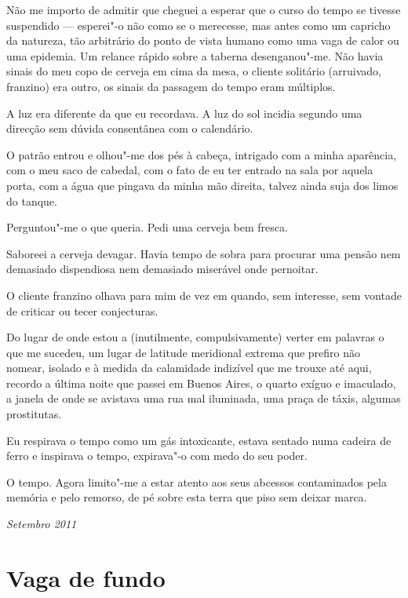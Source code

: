 Não me importo de admitir que cheguei a esperar que o
curso do tempo se tivesse suspendido --- esperei"-o não como se o
merecesse, mas antes como um capricho da natureza, tão arbitrário do
ponto de vista humano como uma vaga de calor ou uma epidemia. Um relance
rápido sobre a taberna desenganou"-me. Não havia sinais do meu copo de
cerveja em cima da mesa, o cliente solitário (arruivado, franzino) era
outro, os sinais da passagem do tempo eram múltiplos.

A luz era diferente da que eu recordava. A luz do sol incidia segundo
uma direcção sem dúvida consentânea com o calendário.

O patrão entrou e olhou"-me dos pés à cabeça, intrigado com a minha
aparência, com o meu saco de cabedal, com o fato de eu ter entrado na
sala por aquela porta, com a água que pingava da minha mão direita,
talvez ainda suja dos limos do tanque.

Perguntou"-me o que queria. Pedi uma cerveja bem fresca.

Saboreei a
cerveja devagar. Havia tempo de sobra para procurar uma pensão nem
demasiado dispendiosa nem demasiado miserável onde pernoitar.

O cliente franzino olhava para mim de vez em quando, sem interesse, sem
vontade de criticar ou tecer conjecturas.

Do lugar de onde estou a (inutilmente, compulsivamente) verter em
palavras o que me sucedeu, um lugar de latitude meridional extrema que
prefiro não nomear, isolado e à medida da calamidade indizível que me
trouxe até aqui, recordo a última noite que passei em Buenos Aires, o
quarto exíguo e imaculado, a janela de onde se avistava uma rua mal
iluminada, uma praça de táxis, algumas prostitutas.

Eu respirava o tempo como um gás intoxicante, estava sentado numa
cadeira de ferro e inspirava o tempo, expirava"-o com medo do seu poder.

O tempo. Agora limito"-me a estar atento aos seus abcessos contaminados
pela memória e pelo remorso, de pé sobre esta terra que piso sem deixar
marca.

\begin{flushright}
\emph{Setembro 2011}
\end{flushright}

\chapter{Vaga de fundo}

